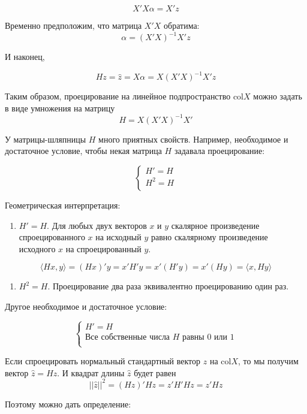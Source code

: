 \documentclass[11pt,russian,]{article}
\providecommand{\tightlist}{%
  \setlength{\itemsep}{0pt}\setlength{\parskip}{0pt}}
\newcommand{\1}{\mathbbm{1}}
\newcommand{\col}{\mathcal{col}}
\renewcommand{\col}{\mathrm{col}}
\begin{document}
\[
X'X\alpha = X'z
\]

Временно предположим, что матрица \(X'X\) обратима: \[
\alpha = (X'X)^{-1}X'z
\]

И наконец,

\[
Hz = \hat z = X\alpha = X(X'X)^{-1}X'z
\]

Таким образом, проецирование на линейное подпространство \(\col X\)
можно задать в виде умножения на матрицу \[
H=X(X'X)^{-1}X'
\]

У матрицы-шляпницы \(H\) много приятных свойств. Например, необходимое и
достаточное условие, чтобы некая матрица \(H\) задавала проецирование:

\[
\begin{cases}
H' = H \\
H^2 = H \\
\end{cases}
\]

Геометрическая интерпретация:

\begin{enumerate}
\def\labelenumi{\arabic{enumi}.}
\tightlist
\item
  \(H'=H\). Для любых двух векторов \(x\) и \(y\) скалярное произведение
  спроецированного \(x\) на исходный \(y\) равно скалярному произведение
  исходного \(x\) на спроецированный \(y\).
\end{enumerate}

\[
\langle Hx, y\rangle = (Hx)'y = x' H' y = x' (H'y) = x' (Hy) = \langle x, Hy \rangle
\]

\begin{enumerate}
\def\labelenumi{\arabic{enumi}.}
\setcounter{enumi}{1}
\tightlist
\item
  \(H^2=H\). Проецирование два раза эквивалентно проецированию один раз.
\end{enumerate}

Другое необходимое и достаточное условие:

\[
\begin{cases}
H' = H \\
\text{Все собственные числа } H \text{ равны } 0 \text{ или } 1\\
\end{cases}
\]

Если спроецировать нормальный стандартный вектор \(z\) на \(\col X\), то
мы получим вектор \(\hat z = Hz\). И квадрат длины \(\hat z\) будет
равен \[
||\hat z ||^2 = (Hz)'Hz=z'H'Hz = z'Hz
\]

Поэтому можно дать определение:
\end{document}

